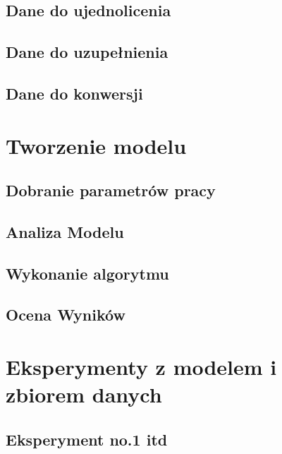 \documentclass[12pt, a4paper]{report}
\begin{document}
\subsection{Dane do ujednolicenia}
\subsection{Dane do uzupełnienia} %
\subsection{Dane do konwersji} %


\section{Tworzenie modelu}


\subsection{Dobranie parametrów pracy}

\subsection{Analiza Modelu}

\subsection{Wykonanie algorytmu}

\subsection{Ocena Wyników}

\section{Eksperymenty z modelem i zbiorem danych}

\subsection{Eksperyment no.1 itd}
\end{document}
